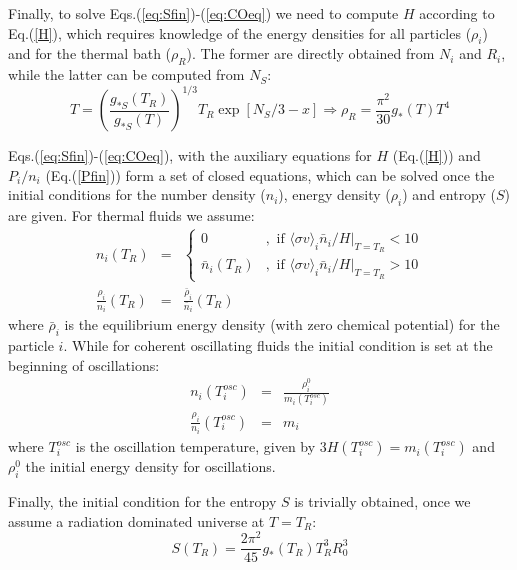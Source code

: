 \documentclass[preprint,notoc]{JHEP3}
\def\sigv{\langle \sigma v \rangle}
\def\To{\Rightarrow}
\begin{document}
Finally, to solve Eqs.(\ref{eq:Sfin})-(\ref{eq:COeq}) we need to compute $H$
according to Eq.(\ref{H}), which requires knowledge of the energy densities for all
particles ($\rho_i$) and for the thermal bath ($\rho_R$). The former are directly obtained from $N_i$ and $R_i$, while the latter can be
 computed from $N_S$:
\begin{equation}
T = \left(\frac{g_{*S}(T_R)}{g_{*S}(T)}\right)^{1/3} T_R \exp[N_S/3 -x] \To \rho_R = \frac{\pi^2}{30} g_{*}(T) T^4
\end{equation}

Eqs.(\ref{eq:Sfin})-(\ref{eq:COeq}), with the auxiliary equations for $H$
(Eq.(\ref{H})) and $P_i/n_i$ (Eq.(\ref{Pfin})) form a set of closed equations, which can be solved once the initial conditions for the number
density ($n_i$), energy density ($\rho_i$) and entropy ($S$) are given. For thermal fluids we assume:
\begin{eqnarray}
n_i(T_R) & = & \left\{ 
\begin{array}{ll} 
0 & , \mbox{ if $\sigv_i \bar{n}_i/H|_{T=T_R} < 10$} \\
\bar{n}_i(T_R) & , \mbox{ if $\sigv_i \bar{n}_i/H|_{T=T_R} > 10$} 
\end{array} \right. \label{ni0TP} \\
\frac{\rho_i}{n_i}(T_R) & = & \frac{\bar{\rho}_i}{\bar{n}_i}(T_R)
\end{eqnarray}
where $\bar{\rho}_i$ is the equilibrium energy density (with zero chemical potential) for the particle $i$.
While for coherent oscillating fluids the initial condition is set at the beginning of oscillations:
\begin{eqnarray}
n_i(T^{osc}_i) & = &\frac{\rho_i^{0}}{m_i(T^{osc}_i)} \\
\frac{\rho_i}{n_i}(T^{osc}_i) & = & m_i
\end{eqnarray}
where $T^{osc}_i$ is the oscillation temperature, given by $3H(T^{osc}_i) = m_i(T^{osc}_i)$ and $\rho_i^{0}$ the
initial energy density for oscillations.

Finally, the initial condition for the entropy $S$ is trivially obtained, once we assume a radiation dominated universe
at $T=T_R$:
\begin{equation}
S(T_R) = \frac{2 \pi^2}{45} g_*(T_R) T_R^3 R_0^3
\end{equation}
\end{document}
